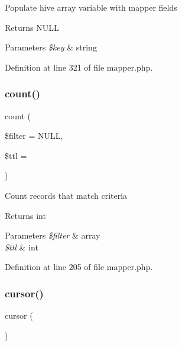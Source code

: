 Populate hive array variable with mapper fields \begin{DoxyReturn}{Returns}
N\+U\+LL 
\end{DoxyReturn}

\begin{DoxyParams}{Parameters}
{\em \$key} & string \\
\hline
\end{DoxyParams}


Definition at line 321 of file mapper.\+php.

\hypertarget{class_d_b_1_1_mongo_1_1_mapper_ab1f3a3bd85dca49dceaea57f2fe21abf}{}\label{class_d_b_1_1_mongo_1_1_mapper_ab1f3a3bd85dca49dceaea57f2fe21abf} 
\subsubsection{\texorpdfstring{count()}{count()}}
{\footnotesize\ttfamily count (\begin{DoxyParamCaption}\item[{}]{\$filter = {\ttfamily NULL},  }\item[{}]{\$ttl = {} }\end{DoxyParamCaption})}

Count records that match criteria \begin{DoxyReturn}{Returns}
int 
\end{DoxyReturn}

\begin{DoxyParams}{Parameters}
{\em \$filter} & array \\
\hline
{\em \$ttl} & int \\
\hline
\end{DoxyParams}


Definition at line 205 of file mapper.\+php.

\hypertarget{class_d_b_1_1_mongo_1_1_mapper_aa3b267270ebe136571604fe35ce404fa}{}\label{class_d_b_1_1_mongo_1_1_mapper_aa3b267270ebe136571604fe35ce404fa} 
\subsubsection{\texorpdfstring{cursor()}{cursor()}}
{\footnotesize\ttfamily cursor (\begin{DoxyParamCaption}{ }\end{DoxyParamCaption})}

